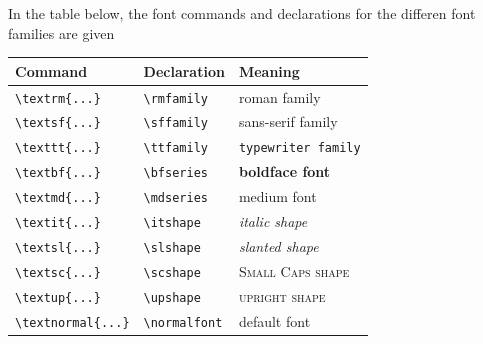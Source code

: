 		In the table below, the font commands and declarations for the differen font families are given
		\begin{table}[h!]
			\centering
			\begin{tabular}{lll}
				\toprule[1.5pt]
				\textbf{Command} & \textbf{Declaration} & \textbf{Meaning} \\
				\midrule
				{\lstinline|\textrm{...}|} & {\lstinline|\rmfamily|} & {\textrm{roman family}} \\
				{\lstinline|\textsf{...}|} & {\lstinline|\sffamily|} & {\textsf{sans-serif family}} \\
				{\lstinline|\texttt{...}|} & {\lstinline|\ttfamily|} & {\texttt{typewriter family}} \\
				{\lstinline|\textbf{...}|} & {\lstinline|\bfseries|} & {\textbf{boldface font}} \\
				{\lstinline|\textmd{...}|} & {\lstinline|\mdseries|} & {\textmd{medium font}} \\
				{\lstinline|\textit{...}|} & {\lstinline|\itshape|} & {\textit{italic shape}} \\
				{\lstinline|\textsl{...}|} & {\lstinline|\slshape|} & {\textsl{slanted shape}} \\
				{\lstinline|\textsc{...}|} & {\lstinline|\scshape|} & {\textsc{Small Caps shape}} \\
				{\lstinline|\textup{...}|} & {\lstinline|\upshape|} & {\textsc{upright shape}} \\
				{\lstinline|\textnormal{...}|} & {\lstinline|\normalfont|} & {\textnormal{default font}} \\
				\bottomrule[1.5pt]
			\end{tabular}
		\end{table}
		
		

